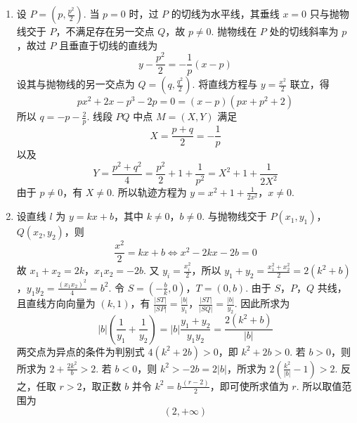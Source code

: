 \begin{solution}
\begin{enumerate}
\item 设 \(P=(p,\frac{p^2}{2})\). 当 \(p=0\) 时，过 \(P\) 的切线为水平线，其垂线 \(x=0\) 只与抛物线交于 \(P\)，不满足存在另一交点 \(Q\)，故 \(p\ne0\). 抛物线在 \(P\) 处的切线斜率为 \(p\)，故过 \(P\) 且垂直于切线的直线为
\[
y-\frac{p^2}{2}=-\frac1p(x-p)
\]
设其与抛物线的另一交点为 \(Q=(q,\frac{q^2}{2})\).  将直线方程与 \(y=\frac{x^2}{2}\) 联立，得
\[
px^2+2x-p^3-2p=0=(x-p)(px+p^2+2)
\]
所以 \(q=-p-\frac2p\).  线段 \(PQ\) 中点 \(M=(X,Y)\) 满足
\[
X=\frac{p+q}{2}=-\frac1p
\]
以及
\[
Y=\frac{p^2+q^2}{4}=\frac{p^2}{2}+1+\frac1{p^2}=X^2+1+\frac1{2X^2}
\]
由于 \(p\ne0\)，有 \(X\ne0\).  所以轨迹方程为
\(y=x^2+1+\frac1{2x^2}\)，\(x\ne0\).

\item 设直线 \(l\) 为 \(y=kx+b\)，其中 \(k\ne0\)，\(b\ne0\).  与抛物线交于 \(P(x_1,y_1)\)，\(Q(x_2,y_2)\)，则
\[
\frac{x^2}{2}=kx+b\Longleftrightarrow x^2-2kx-2b=0
\]
故
\(x_1+x_2=2k\)，\(x_1x_2=-2b\).
又 \(y_i=\frac{x_i^2}{2}\)，所以
\(y_1+y_2=\frac{x_1^2+x_2^2}{2}=2(k^2+b)\)，\(y_1y_2=\frac{(x_1x_2)^2}{4}=b^2\).
令 \(S=(-\frac{b}{k},0)\)，\(T=(0,b)\).  由于 \(S\)，\(P\)，\(Q\) 共线，且直线方向向量为 \((k,1)\)，有
\(\frac{|ST|}{|SP|}=\frac{|b|}{y_1}\)，\(\frac{|ST|}{|SQ|}=\frac{|b|}{y_2}\).
因此所求为
\[
|b|\left(\frac1{y_1}+\frac1{y_2}\right)
 =|b|\frac{y_1+y_2}{y_1y_2}
 =\frac{2(k^2+b)}{|b|}
\]
两交点为异点的条件为判别式 \(4(k^2+2b)>0\)，即 \(k^2+2b>0\).  若 \(b>0\)，则所求为 \(2+\frac{2k^2}{b}>2\).  若 \(b<0\)，则 \(k^2>-2b=2|b|\)，所求为 \(2(\frac{k^2}{|b|}-1)>2\).  反之，任取 \(r>2\)，取正数 \(b\) 并令 \(k^2=b\frac{(r-2)}{2}\)，即可使所求值为 \(r\).  所以取值范围为
\[
(2,+\infty)
\]
\end{enumerate}
\end{solution}
